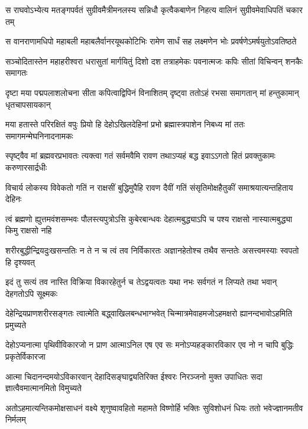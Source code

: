 \fourlineindentedshloka
{स राघवोऽभ्येत्य मतङ्गपर्वतं}
{सुग्रीवमैत्रीमनलस्य सन्निधौ}
{कृत्वैकबाणेन निहत्य वालिनं}
{सुग्रीवमेवाधिपतिं चकार तम्} %

\fourlineindentedshloka
{स वानराणामधिपो महाबली}
{महाबलैर्वानरयूथकोटिभिः}
{रामेण सार्धं सह लक्ष्मणेन भोः}
{प्रवर्षणेऽमर्षयुतोऽवतिष्ठते} %

\fourlineindentedshloka
{सञ्चोदितास्तेन महाहरीश्वरा}
{धरासुतां मार्गयितुं दिशो दश}
{तत्राहमेकः पवनात्मजः कपिः}
{सीतां विचिन्वन् शनकैः समागतः} %

\fourlineindentedshloka
{दृष्टा मया पद्मपलाशलोचना}
{सीता कपित्वाद्विपिनं विनाशितम्}
{दृष्ट्वा ततोऽहं रभसा समागतान्}
{मां हन्तुकामान् धृतचापसायकान्} %

\fourlineindentedshloka
{मया हतास्ते परिरक्षितं वपुः}
{प्रियो हि देहोऽखिलदेहिनां प्रभो}
{ब्रह्मास्त्रपाशेन निबध्य मां ततः}
{समागमन्मेघनिनादनामकः} %

\fourlineindentedshloka
{स्पृष्ट्वैव मां ब्रह्मवरप्रभावतः}
{त्यक्त्वा गतं सर्वमवैमि रावण}
{तथाऽप्यहं बद्ध इवाऽऽगतो हितं}
{प्रवक्तुकामः करुणारसार्द्रधीः} %

\fourlineindentedshloka
{विचार्य लोकस्य विवेकतो गतिं}
{न राक्षसीं बुद्धिमुपैहि रावण}
{दैवीं गतिं संसृतिमोक्षहैतुकीं}
{समाश्रयात्यन्तहिताय देहिनः} %

\fourlineindentedshloka
{त्वं ब्रह्मणो ह्युत्तमवंशसम्भवः}
{पौलस्त्यपुत्रोऽसि कुबेरबान्धवः}
{देहात्मबुद्ध्याऽपि च पश्य राक्षसो}
{नास्यात्मबुद्ध्या किमु राक्षसो नहि} %

\fourlineindentedshloka
{शरीरबुद्धीन्द्रियदुःखसन्ततिः}
{न ते न च त्वं तव निर्विकारतः}
{अज्ञानहेतोश्च तथैव सन्ततेः}
{असत्त्वमस्याः स्वपतो हि दृश्यवत्} %

\fourlineindentedshloka
{इदं तु सत्यं तव नास्ति विक्रिया}
{विकारहेतुर्न च तेऽद्वयत्वतः}
{यथा नभः सर्वगतं न लिप्यते}
{तथा भवान् देहगतोऽपि सूक्ष्मकः}

\fourlineindentedshloka
{देहेन्द्रियप्राणशरीरसङ्गतः}
{त्वात्मेति बद्ध्वाखिलबन्धभाग्भवेत्} %
{चिन्मात्रमेवाहमजोऽहमक्षरो}
{ह्यानन्दभावोऽहमिति प्रमुच्यते}

\fourlineindentedshloka
{देहोऽप्यनात्मा पृथिवीविकारजो}
{न प्राण आत्माऽनिल एष एव सः} %
{मनोऽप्यहङ्कारविकार एव नो}
{न चापि बुद्धिः प्रकृतेर्विकारजा}

\fourlineindentedshloka
{आत्मा चिदानन्दमयोऽविकारवान्}
{देहादिसङ्घाद्व्यतिरिक्त ईश्वरः} %
{निरञ्जनो मुक्त उपाधितः सदा}
{ज्ञात्वैवमात्मानमितो विमुच्यते}

\fourlineindentedshloka
{अतोऽहमात्यन्तिकमोक्षसाधनं}
{वक्ष्ये शृणुष्वावहितो महामते} %
{विष्णोर्हि भक्तिः सुविशोधनं धियः}
{ततो भवेज्ज्ञानमतीव निर्मलम्}

